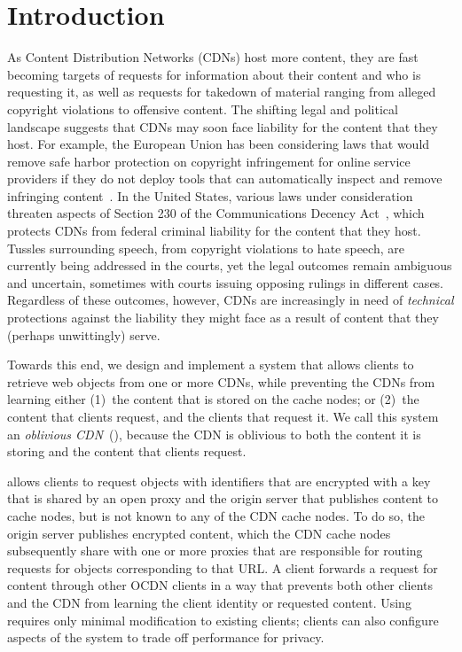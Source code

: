 \section{Introduction}
\label{sec:intro}

As Content Distribution Networks (CDNs) host more content,
they are fast becoming targets of requests for information about their content
and who is requesting it, as well as requests for takedown of material ranging
from alleged copyright violations to offensive content. The shifting legal and
political landscape suggests that CDNs may soon face liability for the content
that they host. For example, the European Union has been considering laws that
would remove safe harbor protection on copyright infringement for online
service providers if they do not deploy tools that can automatically inspect
and remove infringing content~\cite{eu-copyright}. In the United States,
various laws under consideration threaten aspects of Section 230 of the
Communications Decency Act~\cite{sec230}, which protects CDNs from federal
criminal liability for the content that they host. Tussles surrounding speech,
from copyright violations to hate speech, are currently being addressed in the
courts, yet the legal outcomes remain ambiguous and uncertain, sometimes with
courts issuing opposing rulings in different cases. Regardless of these
outcomes, however, CDNs are increasingly in need of {\em technical}
protections against the liability they might face as a result of content that
they (perhaps unwittingly) serve.

Towards this end, we design and implement a system that allows clients to
retrieve web objects from one or more CDNs, while preventing the CDNs from
learning either (1)~the content that is stored on the cache nodes; or (2)~the content
that clients request, and the clients that request it. We call this system an {\em
oblivious
CDN}~(\system{}), because the CDN is oblivious to both the content it is
storing and the content that clients request.

\system{} allows clients to request objects with identifiers that
are encrypted with a key that is shared by an open proxy and the origin server
that publishes content to cache nodes, but is not known to any of the CDN
cache nodes.  To do so, the origin server publishes encrypted content, 
which the CDN cache nodes subsequently share with one or more proxies that are responsible
for
routing requests for objects corresponding to that URL.  A client forwards a
request for content through other OCDN clients in a way
that prevents both other clients and the CDN from learning the client
identity or requested content.  Using \system{} requires only minimal modification to existing clients; clients can also configure aspects of the system to trade off performance for privacy.


